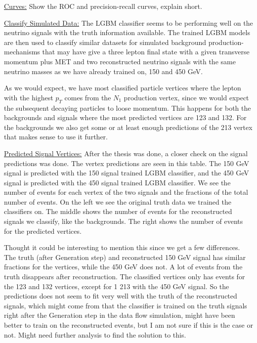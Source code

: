 \documentclass[a4paper, american, 12pt]{report}
\begin{document}
	
	\underline{Curves:}
	Show the ROC and precision-recall curves, explain short.
	
	
	\underline{Classify Simulated Data:}
	The LGBM classifier seems to be performing well on the neutrino signals with the truth information available. The trained LGBM models are then used to classify similar datasets for simulated background production-mechanisms that may have give a three lepton  final state with a given transverse momentum plus MET and two reconstructed neutrino signals with the same neutrino masses as we have already trained on, 150 and 450 GeV.
	
	As we would expect, we have most classified particle vertices where the lepton with the highest $p_T$ comes from the $N_1$ production vertex, since we would expect the subsequent decaying particles to loose momentum. This happens for both the backgrounds and signals where the most predicted vertices are 123 and 132. For the backgrounds we also get some or at least enough predictions of the 213 vertex that makes sense to use it further.
	
	
	\underline{Predicted Signal Vertices:}
	After the thesis was done, a closer check on the signal predictions was done. The vertex predictions are seen in this table. The 150 GeV signal is predicted with the 150 signal trained LGBM classifier, and the 450 GeV signal is predicted with the 450 signal trained LGBM classifier. We see the number of events for each vertex of the two signals and the fractions of the total number of events. On the left we see the original truth data we trained the classifiers on. The middle shows the number of events for the reconstructed signals we classify, like the backgrounds. The right shows the number of events for the predicted vertices.
	
	Thought it could be interesting to mention this since we get a few differences. The truth (after Generation step) and reconstructed 150 GeV signal has similar fractions for the vertices, while the 450 GeV does not. A lot of events from the truth disappears after reconstruction. The classified vertices only has events for the 123 and 132 vertices, except for 1 213 with the 450 GeV signal. So the predictions does not seem to fit very well with the truth of the reconstructed signals, which might come from that the classifier is trained on the truth signals right after the Generation step in the data flow simulation, might have been better to train on the reconstructed events, but I am not sure if this is the case or not. Might need further analysis to find the solution to this.
	
\end{document}
